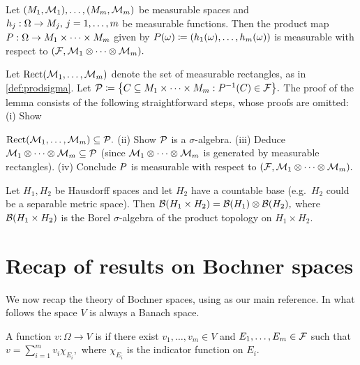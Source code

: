 \label{lem:measprod}

Let $\mleft(\M_1,\FM_1\mright),\ldots,\mleft(\M_m,\FM_m\mright)$ be measurable spaces and $h_j:\Omega \rightarrow M_j,\, j = 1,\ldots,m$ be measurable functions. Then the product map $P:\Omega \rightarrow M_1 \times \cdots \times M_m$ given by
$\Prodf(\omega) \de \mleft(h_1(\omega),\ldots,h_m(\omega)\mright)$
is measurable with respect to $\mleft(\cF,\FM_1 \otimes \cdots\otimes\FM_m\mright).$
\ele


Let $\measrectmany{\FM_1,\ldots,\FM_m}$ denote the set of measurable rectangles, as in \cref{def:prodsigma}. Let %
$\cP \de \set{C \subseteq \M_1 \times \cdots \times \M_m \st \Prodf^{-1}\mleft(C\mright) \in \cF}.$
The proof of the lemma consists of the following straightforward steps, whose proofs are omitted:
(i) Show 

\noindent $\measrectmany{\FM_1,\ldots,\FM_m} \subseteq \cP.$
(ii) Show $\mathcal P$ is a $\sigma$-algebra.
(iii) Deduce $\mathcal M_1 \otimes \cdots \otimes \mathcal M_m \subseteq \mathcal P$ (since $\mathcal M_1 \otimes \cdots \otimes \mathcal M_m$ is generated by measurable rectangles).
(iv) Conclude $P$ is measurable with respect to $\mleft(\cF,\FM_1\otimes\cdots\otimes\FM_m\mright).$
\epf

\label{lem:bogachev}
Let $H_1,H_2$ be Hausdorff spaces and let $H_2$ have a countable base (e.g.~$H_2$ could be a separable metric space). Then $\Borel{H_1\times H_2} = \Borel{H_1} \otimes \Borel{H_2},$ where $\Borel{H_1\times H_2}$ is the Borel $\sigma$-algebra of the product topology on $H_1\times H_2.$
\ele

\section{Recap of results on Bochner spaces}

We now recap the theory of Bochner spaces, using \cite{DiUh:77} as our main reference. In what follows the space $V$ is always a Banach space.

A function $v:\Omega \rightarrow V$ is  if there exist $v_1,\ldots,v_m \in V$ and $E_1,\ldots,E_m \in \mathcal F$ such that
$v = \sum_{i=1}^m v_i \chi_{E_{i}},$
where $\chi_{E_{i}}$ is the indicator function on $E_{i}.$
\ede

